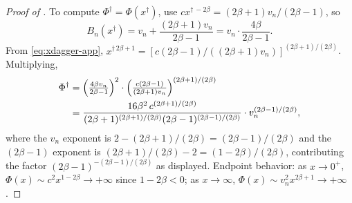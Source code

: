 \begin{proof}[Proof of ]
To compute $\Phi^\dagger = \Phi(x^\dagger)$, use $c x^{\dagger\, -2\beta} = (2\beta+1) v_n / (2\beta-1)$, so
\[
B_n(x^\dagger) = v_n + \frac{(2\beta+1) v_n}{2\beta - 1}
= v_n \cdot \frac{4\beta}{2\beta - 1}.
\]
From \cref{eq:xdagger-app}, $x^{\dagger\, 2\beta+1} = [c(2\beta-1) / ((2\beta+1) v_n)]^{(2\beta+1)/(2\beta)}$. Multiplying,
\begin{align*}
\Phi^\dagger
&= \Bigl(\tfrac{4\beta v_n}{2\beta - 1}\Bigr)^2
   \cdot \Bigl(\tfrac{c(2\beta-1)}{(2\beta+1) v_n}\Bigr)^{(2\beta+1)/(2\beta)} \\
&= \frac{16 \beta^2\, c^{(2\beta+1)/(2\beta)}}{(2\beta+1)^{(2\beta+1)/(2\beta)}
   (2\beta-1)^{(2\beta-1)/(2\beta)}}
   \cdot v_n^{(2\beta-1)/(2\beta)},
\end{align*}
where the $v_n$ exponent is $2 - (2\beta+1)/(2\beta) = (2\beta-1)/(2\beta)$ and the $(2\beta-1)$ exponent is $(2\beta+1)/(2\beta) - 2 = (1-2\beta)/(2\beta)$, contributing the factor $(2\beta-1)^{-(2\beta-1)/(2\beta)}$ as displayed. Endpoint behavior: as $x \to 0^+$, $\Phi(x) \sim c^2 x^{1-2\beta} \to +\infty$ since $1-2\beta < 0$; as $x \to \infty$, $\Phi(x) \sim v_n^2 x^{2\beta+1} \to +\infty$.
\end{proof}

